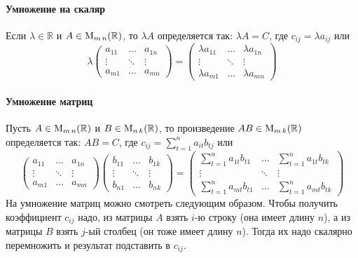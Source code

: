 \paragraph{Умножение на скаляр} Если $\lambda\in \mathbb R$ и $A\in \operatorname{M}_{m\,n}(\mathbb R)$, то $\lambda A$ определяется так: $\lambda A = C$, где $c_{ij} = \lambda a_{ij}$ или
\[
\lambda
\begin{pmatrix}
a_{11}&\ldots& a_{1n}\\
\vdots&\ddots&\vdots\\
a_{m1}& \ldots &a_{mn}
\end{pmatrix}
=
\begin{pmatrix}
\lambda a_{11}&\ldots& \lambda a_{1n}\\
\vdots&\ddots&\vdots\\
\lambda a_{m1}& \ldots &\lambda a_{mn}
\end{pmatrix}
\]
\paragraph{Умножение матриц} Пусть $A\in\operatorname{M}_{m\,n}(\mathbb R)$ и $B\in\operatorname{M}_{n\,k}(\mathbb R)$, то произведение $AB\in\operatorname{M}_{m\,k}(\mathbb R)$ определяется так: $AB = C$, где $c_{ij} = \sum_{t=1}^n a_{it}b_{tj}$ или
\[
\begin{pmatrix}
a_{11}&\ldots& a_{1n}\\
\vdots&\ddots&\vdots\\
a_{m1}& \ldots &a_{mn}
\end{pmatrix}
\begin{pmatrix}
b_{11}&\ldots& b_{1k}\\
\vdots&\ddots&\vdots\\
b_{n1}& \ldots &b_{nk}
\end{pmatrix}
=\begin{pmatrix}
\sum_{t=1}^n a_{1t}b_{t1}&\ldots& \sum_{t=1}^n a_{1t}b_{tk}\\
\vdots&\ddots&\vdots\\
\sum_{t=1}^n a_{mt}b_{t1}& \ldots &\sum_{t=1}^n a_{mt}b_{tk}
\end{pmatrix}
\]
На умножение матриц можно смотреть следующим образом. Чтобы получить коэффициент $c_{ij}$ надо, из матрицы $A$ взять $i$-ю строку (она имеет длину $n$), а из матрицы $B$ взять $j$-ый столбец (он тоже имеет длину $n$). Тогда их надо скалярно перемножить и результат подставить в $c_{ij}$.


